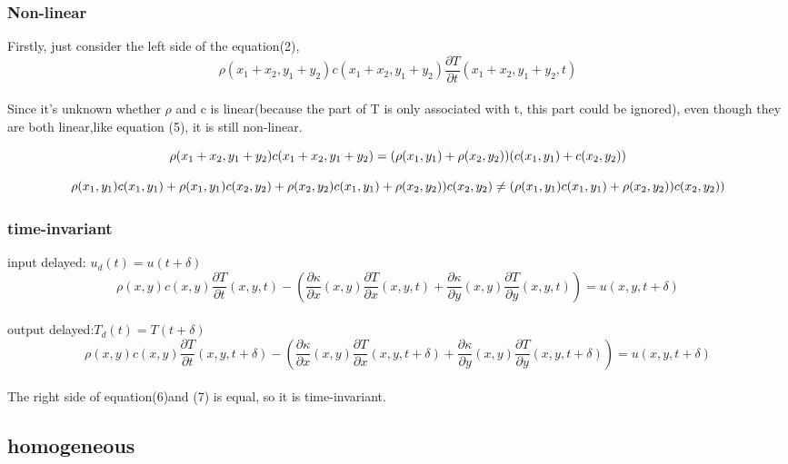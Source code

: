 \documentclass[12pt]{article}
\begin{document}
\subsubsection*{Non-linear}
Firstly, just consider the left side of the equation(2),
\begin{equation}
\rho(x_1+x_2,y_1+y_2) c(x_1+x_2,y_1+y_2) \frac {\partial T} {\partial t}(x_1+x_2,y_1+y_2,t)
\end{equation}\\
Since it's unknown whether $\rho$ and c is linear(because the part of T is only associated with t, this part could be ignored), even though they are both linear,like equation (5), it is still non-linear.

\begin{equation}
\small{\rho(x_1+x_2,y_1+y_2) c(x_1+x_2,y_1+y_2) =(\rho(x_1,y_1)+\rho(x_2,y_2)) (c(x_1,y_1)+c(x_2,y_2))}
\end{equation}

\begin{equation}
\scriptsize{\rho(x_1,y_1)c(x_1,y_1)+\rho(x_1,y_1)c(x_2,y_2)+\rho(x_2,y_2)c(x_1,y_1)+\rho(x_2,y_2))c(x_2,y_2) \neq (\rho(x_1,y_1)c(x_1,y_1)+\rho(x_2,y_2))c(x_2,y_2))}
\end{equation}

\subsubsection*{time-invariant}
input delayed: $u_d(t)=u(t+\delta)$\\
\begin{equation}
\rho (x,y)c(x,y)\frac {\partial T} {\partial t}(x,y,t)-(\frac {\partial \kappa} {\partial x}(x,y) \frac {\partial T} {\partial x}(x,y,t)+\frac {\partial \kappa} {\partial y}(x,y) \frac {\partial T} {\partial y}(x,y,t))=u(x,y,t+\delta)
\end{equation}\\
output delayed:$T_d(t)=T(t+\delta)$\\
\begin{equation}
\rho (x,y)c(x,y)\frac {\partial T} {\partial t}(x,y,t+\delta)-(\frac {\partial \kappa} {\partial x}(x,y) \frac {\partial T} {\partial x}(x,y,t+\delta)+\frac {\partial \kappa} {\partial y}(x,y) \frac {\partial T} {\partial y}(x,y,t+\delta))=u(x,y,t+\delta)
\end{equation}\\
The right side of equation(6)and (7) is equal, so it is time-invariant.

\subsection*{homogeneous}
\end{document}
